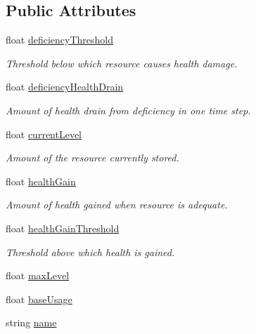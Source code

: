 \subsection*{Public Attributes}
\begin{DoxyCompactItemize}
\item 
float \mbox{\hyperlink{class_creature_resource_a1d8ce8cdf8414b708970f1e3c6742715}{deficiency\+Threshold}}
\begin{DoxyCompactList}\small\item\em Threshold below which resource causes health damage. \end{DoxyCompactList}\item 
float \mbox{\hyperlink{class_creature_resource_a3d2bf29f213887c3d85882ab71bf941c}{deficiency\+Health\+Drain}}
\begin{DoxyCompactList}\small\item\em Amount of health drain from deficiency in one time step. \end{DoxyCompactList}\item 
float \mbox{\hyperlink{class_creature_resource_a588a6af5013d944441028c859ab6cabe}{current\+Level}}
\begin{DoxyCompactList}\small\item\em Amount of the resource currently stored. \end{DoxyCompactList}\item 
float \mbox{\hyperlink{class_creature_resource_a6aaa2e2cde79ab61cbf3683eccc2abff}{health\+Gain}}
\begin{DoxyCompactList}\small\item\em Amount of health gained when resource is adequate. \end{DoxyCompactList}\item 
float \mbox{\hyperlink{class_creature_resource_a2c4cc459420f7200685c9f0978a63116}{health\+Gain\+Threshold}}
\begin{DoxyCompactList}\small\item\em Threshold above which health is gained. \end{DoxyCompactList}\item 
float \mbox{\hyperlink{class_creature_resource_ac971dcddb000d950d2bfe414e4a5ca7b}{max\+Level}}
\item 
float \mbox{\hyperlink{class_creature_resource_a6ed5ee9d74de65191323bd6bfd5764e5}{base\+Usage}}
\item 
string \mbox{\hyperlink{class_creature_resource_a4653faf953fa8384caf57e2b47893d3a}{name}}
\end{DoxyCompactItemize}



